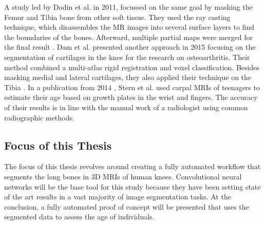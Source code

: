 A study led by Dodin et al. in 2011, focussed on the same goal by masking the Femur and Tibia bone from other soft tissue. They used the ray casting technique, which disassembles the MR images into several surface layers to find the boundaries of the bones. Afterward, multiple partial maps were merged for the final result \cite{Dodin2011}. Dam et al. presented another approach in 2015 focusing on the segmentation of cartilages in the knee for the research on osteoarthritis. Their method combined a multi-atlas rigid registration and voxel classification. Besides masking medial and lateral cartilages, they also applied their technique on the Tibia \cite{Dam}. In a publication from 2014 \cite{Stern2014}, Stern et al. used carpal MRIs of teenagers to estimate their age based on growth plates in the wrist and fingers. The accuracy of their results is in line with the manual work of a radiologist using common radiographic methods.

\subsection{Focus of this Thesis}

The focus of this thesis revolves around creating a fully automated workflow that segments the long bones in 3D MRIs of human knees. Convolutional neural networks will be the base tool for this study because they have been setting state of the art results in a vast majority of image segmentation tasks. At the conclusion, a fully automated proof of concept will be presented that uses the segmented data to assess the age of individuals.

\newpage
